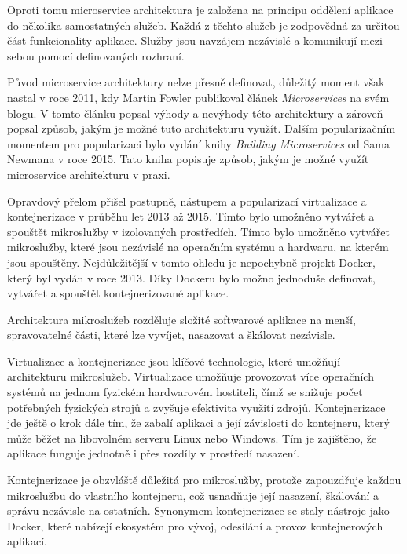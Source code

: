 Oproti tomu microservice architektura je založena na principu oddělení aplikace do několika samostatných služeb. Každá z těchto služeb je zodpovědná za určitou část funkcionality aplikace. Služby jsou navzájem nezávislé a komunikují mezi sebou pomocí definovaných rozhraní. \cite{Richardson2018}

Původ microservice architektury nelze přesně definovat, důležitý moment však nastal v roce 2011, kdy Martin Fowler publikoval článek \textit{Microservices} na svém blogu. V tomto článku popsal výhody a nevýhody této architektury a zároveň popsal způsob, jakým je možné tuto architekturu využít. Dalším popularizačním momentem pro popularizaci bylo vydání knihy \textit{Building Microservices} od Sama Newmana v roce 2015. Tato kniha popisuje způsob, jakým je možné využít microservice architekturu v praxi.

Opravdový přelom přišel postupně, nástupem a popularizací virtualizace a kontejnerizace v průběhu let 2013 až 2015. Tímto bylo umožněno vytvářet a spouštět mikroslužby v izolovaných prostředích. Tímto bylo umožněno vytvářet mikroslužby, které jsou nezávislé na operačním systému a hardwaru, na kterém jsou spouštěny. Nejdůležitější v tomto ohledu je nepochybně projekt Docker, který byl vydán v roce 2013. Díky Dockeru bylo možno jednoduše definovat, vytvářet a spouštět kontejnerizované aplikace.


Architektura mikroslužeb rozděluje složité softwarové aplikace na menší, spravovatelné části, které lze vyvíjet, nasazovat a škálovat nezávisle.


Virtualizace a kontejnerizace jsou klíčové technologie, které umožňují architekturu mikroslužeb. Virtualizace umožňuje provozovat více operačních systémů na jednom fyzickém hardwarovém hostiteli, čímž se snižuje počet potřebných fyzických strojů a zvyšuje efektivita využití zdrojů. Kontejnerizace jde ještě o krok dále tím, že zabalí aplikaci a její závislosti do kontejneru, který může běžet na libovolném serveru Linux nebo Windows. Tím je zajištěno, že aplikace funguje jednotně i přes rozdíly v prostředí nasazení.

Kontejnerizace je obzvláště důležitá pro mikroslužby, protože zapouzdřuje každou mikroslužbu do vlastního kontejneru, což usnadňuje její nasazení, škálování a správu nezávisle na ostatních. Synonymem kontejnerizace se staly nástroje jako Docker, které nabízejí ekosystém pro vývoj, odesílání a provoz kontejnerových aplikací.

